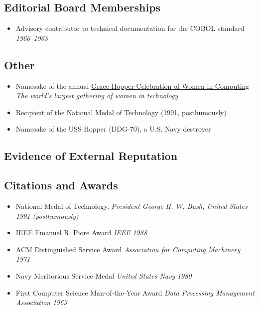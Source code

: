 \documentclass[11pt]{report}
\newcommand{\dates}[1]{\hfill \textit{#1}}
\newcommand{\institution}[1]{\textit{#1}}
\begin{document}
\section{Editorial Board Memberships}

\begin{itemize}
\item Advisory contributor to technical documentation for the COBOL standard \dates{1960--1963}
\end{itemize}

\section{Other}

\begin{itemize}
\item Namesake of the annual \href{https://ghc.anitab.org/}{Grace Hopper Celebration of Women in Computing} \\
  \emph{The world's largest gathering of women in technology}
\item Recipient of the National Medal of Technology (1991, posthumously)
\item Namesake of the USS Hopper (DDG-70), a U.S. Navy destroyer
\end{itemize}


\begin{internalonly}
\chapter{Evidence of External Reputation}
\end{internalonly}
\section{Citations and Awards}

\begin{itemize}
\item National Medal of Technology, \institution{President George H. W. Bush, United States} \dates{1991 (posthumously)}
\item IEEE Emanuel R. Piore Award \institution{IEEE} \dates{1988}
\item ACM Distinguished Service Award \institution{Association for Computing Machinery} \dates{1971}
\item Navy Meritorious Service Medal \institution{United States Navy} \dates{1980}
\item First Computer Science Man-of-the-Year Award \institution{Data Processing Management Association} \dates{1969}
\end{itemize}
\end{document}
